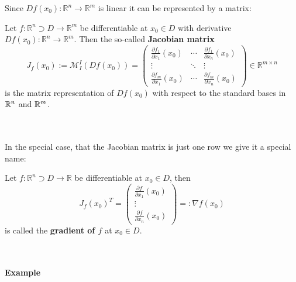 \begin{frame}
Since $Df(x_0):\mathbb{R}^n\rightarrow\mathbb{R}^m$ is linear it can be represented by a matrix:
~\\
\begin{lemma}[Jacobian]
Let $f:\mathbb{R}^n\supset D\rightarrow\mathbb{R}^m$ be differentiable at $x_0\in D$ with derivative $Df(x_0):\mathbb{R}^n\rightarrow\mathbb{R}^m$. Then the so-called \textbf{Jacobian matrix}
$$
J_f(x_0):=\mathcal{M}_{I}^{I}(Df(x_0)) =\begin{pmatrix}
\frac{\partial f_1}{\partial x_1}(x_0)&\cdots&\frac{\partial f_1}{\partial x_n}(x_0)\\\vdots&\ddots&\vdots\\
\frac{\partial f_m}{\partial x_1}(x_0)&\cdots&\frac{\partial f_m}{\partial x_n}(x_0)
\end{pmatrix}\in\mathbb{R}^{m\times n}
$$
is the matrix representation of $Df(x_0)$ with respect to the standard bases in ${\mathbb{R}}^{n}$ and ${\mathbb{R}}^{m}$.
\end{lemma}
~\\~\\
In the special case, that the Jacobian matrix is just one row we give it a special name:
\begin{definition}[Gradient]
	Let $f:\mathbb{R}^n\supset D\rightarrow\mathbb{R}$ be differentiable at $x_0\in D$, then
	$$
	J_f(x_0)^T=\begin{pmatrix}
	\frac{\partial f}{\partial x_1}(x_0)\\
	\vdots\\
	\frac{\partial f}{\partial x_n}(x_0)
	\end{pmatrix}=:\nabla f(x_0)
	$$
	is called the \textbf{gradient of $f$} at $x_0\in D$.
\end{definition}
\end{frame}

\begin{frame}
~\\~\\
\textbf{Example}~\\~\\
\end{frame}

